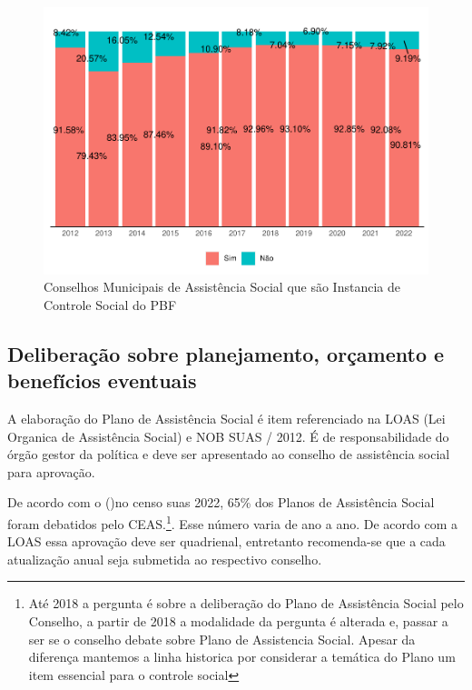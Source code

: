 \documentclass[
  brazilian]{report}
\begin{document}
\begin{figure}
\includegraphics{Censo-SUAS-2022_files/figure-latex/cmas_icspbf-1} \caption[Conselhos Municipais de Assistência Social que são Instancia de Controle Social do PBF]{Conselhos Municipais de Assistência Social que são Instancia de Controle Social do PBF}\label{fig:cmas_icspbf}
\end{figure}

\hypertarget{deliberauxe7uxe3o-sobre-planejamento-oruxe7amento-e-benefuxedcios-eventuais}{%
\subsection{Deliberação sobre planejamento, orçamento e benefícios
eventuais}\label{deliberauxe7uxe3o-sobre-planejamento-oruxe7amento-e-benefuxedcios-eventuais}}

A elaboração do Plano de Assistência Social é item referenciado na LOAS
(Lei Organica de Assistência Social) e NOB SUAS / 2012. É de
responsabilidade do órgão gestor da política e deve ser apresentado ao
conselho de assistência social para aprovação.

De acordo com o ()no censo suas 2022, 65\% dos
Planos de Assistência Social foram debatidos pelo
CEAS.\footnote{Até 2018 a pergunta é sobre a deliberação do Plano de Assistência Social pelo Conselho, a partir de 2018 a modalidade da pergunta é alterada e, passar a ser se o conselho debate sobre Plano de Assistencia Social. Apesar da diferença mantemos a linha historica por considerar a temática do Plano um item essencial para o controle social}.
Esse número varia de ano a ano. De acordo com a LOAS essa aprovação deve
ser quadrienal, entretanto recomenda-se que a cada atualização anual
seja submetida ao respectivo conselho.
\end{document}
